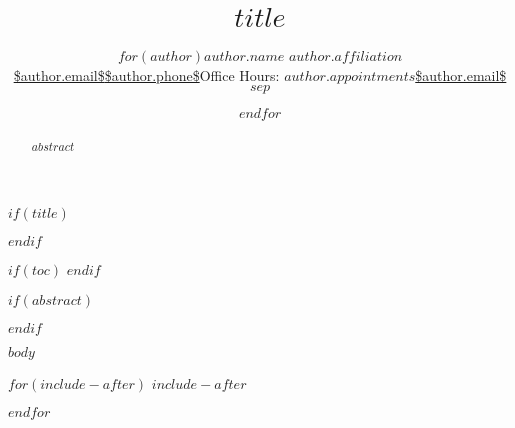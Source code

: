 \documentclass[letterpaper,$fontsize$,$sides$]{memoir}
\title{\bigskip \bigskip $title$}
\author{$for(author)$\Large $author.name$\vspace{0.05in} \newline\normalsize\emph{$author.affiliation$} \newline\footnotesize \url{$author.email$}\vspace*{0.2in}\newline \footnotesize \url{$author.phone$}\vspace*{0.2in}\newline \footnotesize{Office Hours: }\href{https://$author.appointments$}{\texttt{$author.appointments$}}\vspace*{0.2in}\newline \newline \footnotesize \url{$author.email$}\vspace*{0.2in}\newline  $sep$ \and $endfor$}
\date{}
\begin{document}
  

$if(title)$
\maketitle
$endif$





$if(toc)$
{
\hypersetup{linkcolor=black}
\setcounter{tocdepth}{$toc-depth$}
\tableofcontents
}
$endif$


$if(abstract)$

\begin{abstract}

\noindent $abstract$

\end{abstract}

$endif$



$body$



$for(include-after)$
$include-after$

$endfor$
\end{document}
